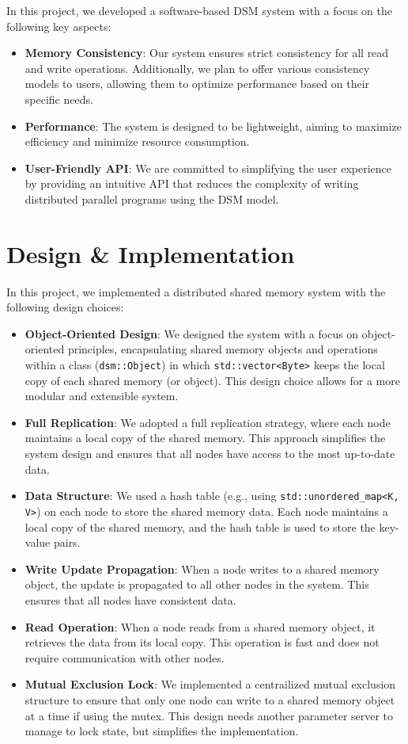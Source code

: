 \documentclass[journal]{IEEEtran}
\begin{document}
In this project, we developed a software-based DSM system with a focus on the following key aspects:
\begin{itemize}
\item \textbf{Memory Consistency}: Our system ensures strict consistency for all read and write operations. Additionally, we plan to offer various consistency models to users, allowing them to optimize performance based on their specific needs.
\item \textbf{Performance}: The system is designed to be lightweight, aiming to maximize efficiency and minimize resource consumption.
\item \textbf{User-Friendly API}: We are committed to simplifying the user experience by providing an intuitive API that reduces the complexity of writing distributed parallel programs using the DSM model.
\end{itemize}

\section{Design \& Implementation}
In this project, we implemented a distributed shared memory system with the following design choices:
\begin{itemize}
\item \textbf{Object-Oriented Design}: We designed the system with a focus on object-oriented principles, encapsulating shared memory objects and operations within a class (\texttt{dsm::Object}) in which \texttt{std::vector<Byte>} keeps the local copy of each shared memory (or object). This design choice allows for a more modular and extensible system.
\item \textbf{Full Replication}: We adopted a full replication strategy, where each node maintains a local copy of the shared memory. This approach simplifies the system design and ensures that all nodes have access to the most up-to-date data.
\item \textbf{Data Structure}: We used a hash table (e.g., using \texttt{std::unordered\_map<K, V>}) on each node to store the shared memory data. Each node maintains a local copy of the shared memory, and the hash table is used to store the key-value pairs.
\item \textbf{Write Update Propagation}: When a node writes to a shared memory object, the update is propagated to all other nodes in the system. This ensures that all nodes have consistent data.
\item \textbf{Read Operation}: When a node reads from a shared memory object, it retrieves the data from its local copy. This operation is fast and does not require communication with other nodes.
\item \textbf{Mutual Exclusion Lock}: We implemented a centrailized mutual exclusion structure to ensure that only one node can write to a shared memory object at a time if using the mutex. This design needs another parameter server to manage to lock state, but simplifies the implementation. 
\end{itemize}
\end{document}

